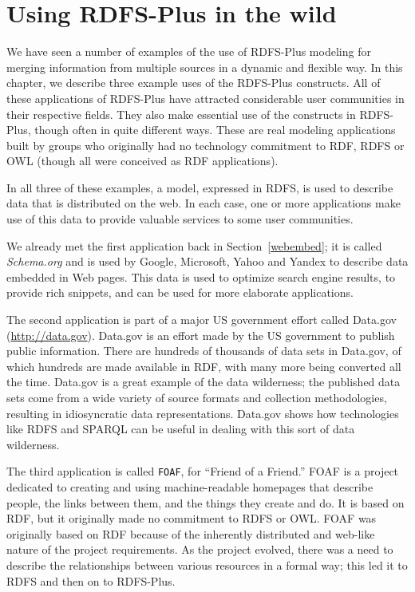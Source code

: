 \chapter{Using RDFS-Plus in the wild}
\label{ch10}

We have seen a number of examples of the use of RDFS-Plus modeling for
merging information from multiple sources in a dynamic and flexible way.
In this chapter, we describe three  example uses of the RDFS-Plus
constructs. All of these applications of RDFS-Plus have attracted
considerable user communities in their respective fields. They
also make essential use of the constructs in RDFS-Plus, though often in
quite different ways. These are real modeling applications built by
groups who originally had no technology commitment to RDF, RDFS or OWL
(though all were conceived as RDF applications).

In all three of these examples, a model, expressed in RDFS, is used to describe
data that is distributed on the web.  In each case, one or more applications
make use of this data to provide valuable services to some user communities.  




We already met the first application back in Section~\ref{webembed}; it is 
called \emph{Schema.org} \cite{guha2016schema} and is used by Google, Microsoft, Yahoo and Yandex 
to describe data embedded in Web pages.  This data is used to optimize search
engine results, to provide rich snippets, and can be used for more elaborate 
applications. 

The second application is part of a major US government effort called
Data.gov (\url{http://data.gov}). Data.gov is an effort made by the US
government to publish public information. There are hundreds of
thousands of data sets in Data.gov, of which hundreds are made available
in RDF, with many more being converted all the time. Data.gov is a great
example of the data wilderness; the published data sets
come from a wide variety of source formats and collection methodologies,
resulting in idiosyncratic data representations. Data.gov shows how
technologies like RDFS and SPARQL can be useful in dealing with this
sort of data wilderness.

The third application is called \texttt{FOAF}, for ``Friend of a Friend.'' FOAF
is a project dedicated to creating and using machine-readable homepages
that describe people, the links between them, and the things they create
and do. It is based on RDF, but it originally made no commitment to RDFS
or OWL.
FOAF was originally based on RDF because of the inherently distributed
and web-like nature of the 
project requirements. As the project evolved, there was a need to
describe the relationships between various resources in a formal way;
this led it to RDFS and then on to RDFS-Plus.




